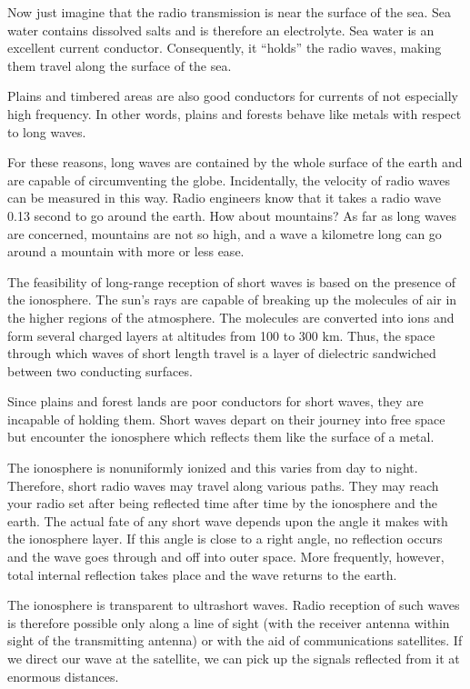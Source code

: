 Now just imagine that the radio transmission is near the surface of the sea. Sea water contains dissolved salts and is therefore an electrolyte. Sea water is an excellent current conductor. Consequently, it ``holds'' the radio waves, making them travel along the surface of the sea.

Plains and timbered areas are also good conductors for currents of not especially high frequency. In other words, plains and forests behave like metals with respect to long waves.

For these reasons, long waves are contained by the whole surface of the earth and are capable of circumventing the globe. Incidentally, the velocity of radio waves can be measured in this way. Radio engineers know that it takes a radio wave 0.13 second to go around the earth. How about mountains? As far as long waves are concerned, mountains are not so high, and a wave a kilometre long can go around a mountain with more or less ease.

The feasibility of long-range reception of short waves is based on the presence of the ionosphere. The sun's rays are capable of breaking up the molecules of air in the higher regions of the atmosphere. The molecules are converted into ions and form several charged layers at altitudes from 100 to 300 km. Thus, the space through which waves of short length travel is a layer of dielectric sandwiched between two conducting surfaces.

Since plains and forest lands are poor conductors for short waves, they are incapable of holding them. Short waves depart on their journey into free space but encounter the ionosphere which reflects them like the surface of a metal.

The ionosphere is nonuniformly ionized and this varies from day to night. Therefore, short radio waves may travel along various paths. They may reach your radio set after being reflected time after time by the ionosphere and the earth. The actual fate of any short wave depends upon the angle it makes with the ionosphere layer. If this angle is close to a right angle, no reflection occurs and the wave goes through and off into outer space. More frequently, however, total internal reflection takes place and the wave returns to the earth.

The ionosphere is transparent to ultrashort waves. Radio reception of such waves is therefore possible only along a line of sight (with the receiver antenna within sight of the transmitting antenna) or with the aid of communications satellites. If we direct our wave at the satellite, we can pick up the signals reflected from it at enormous distances.

